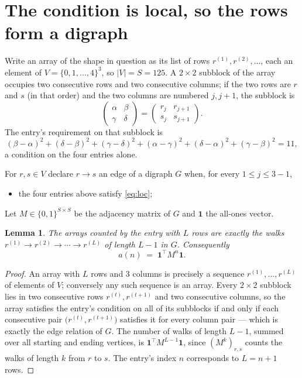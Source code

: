 \documentclass[11pt,a4paper]{article}
\theoremstyle{plain}
\newtheorem{lemma}[theorem]{Lemma}
\theoremstyle{definition}
\begin{document}
\section{The condition is local, so the rows form a digraph}

Write an array of the shape in question as its list of rows
$r^{(1)},r^{(2)},\dots$, each an element of
$V=\{0,1,\dots,4\}^{3}$, so $|V|=S=125$. A $2\times2$ subblock of the array
occupies two consecutive rows and two consecutive columns; if the two rows are $r$
and $s$ (in that order) and the two columns are numbered $j,j+1$,
the subblock is
\[
\begin{pmatrix}\alpha&\beta\\\gamma&\delta\end{pmatrix}=\begin{pmatrix}r_j&r_{j+1}\\s_j&s_{j+1}\end{pmatrix}.
\]
The entry's requirement on that subblock is
\begin{equation}\label{eq:loc}
(\beta-\alpha)^2+(\delta-\beta)^2+(\gamma-\delta)^2+(\alpha-\gamma)^2+(\delta-\alpha)^2+(\gamma-\beta)^2=11,
\end{equation}
a condition on the four entries alone.

For $r,s\in V$ declare $r\to s$ an edge of a digraph $G$ when, for every
$1\le j\le 3-1$,
\begin{itemize}
\item the four entries above satisfy \eqref{eq:loc};

\end{itemize}
Let $M\in\{0,1\}^{S\times S}$ be the adjacency matrix of $G$ and $\mathbf{1}$ the
all-ones vector.

\begin{lemma}\label{lem:walk}
The arrays counted by the entry with $L$ rows are exactly the walks
$r^{(1)}\to r^{(2)}\to\cdots\to r^{(L)}$ of length $L-1$ in $G$. Consequently
\[
a(n)\;=\;\mathbf{1}^{\!\top}M^{n}\mathbf{1} .
\]
\end{lemma}

\begin{proof}
An array with $L$ rows and $3$ columns is precisely a sequence
$r^{(1)},\dots,r^{(L)}$ of elements of $V$; conversely any such sequence is an array.
Every $2\times2$ subblock lies in two consecutive rows $r^{(t)},r^{(t+1)}$ and two
consecutive columns, so the array satisfies the entry's condition on all of its subblocks
if and only if each consecutive pair $\bigl(r^{(t)},r^{(t+1)}\bigr)$ satisfies it for
every column pair --- which is exactly the edge relation of $G$. The number of walks of
length $L-1$, summed over all starting and ending vertices, is
$\mathbf{1}^{\!\top}M^{L-1}\mathbf{1}$, since $(M^{k})_{r,s}$ counts the walks of
length $k$ from $r$ to $s$. The entry's index $n$ corresponds to $L=n+1$ rows.
\end{proof}
\end{document}
